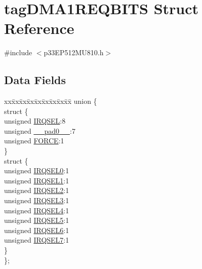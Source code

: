 \hypertarget{structtag_d_m_a1_r_e_q_b_i_t_s}{}\section{tag\+D\+M\+A1\+R\+E\+Q\+B\+I\+TS Struct Reference}
\label{structtag_d_m_a1_r_e_q_b_i_t_s}


{\ttfamily \#include $<$p33\+E\+P512\+M\+U810.\+h$>$}

\subsection*{Data Fields}
\begin{DoxyCompactItemize}
\item 
\begin{tabbing}
xx\=xx\=xx\=xx\=xx\=xx\=xx\=xx\=xx\=\kill
union \{\\
\>struct \{\\
\>\>unsigned \hyperlink{structtag_d_m_a1_r_e_q_b_i_t_s_a5e70ba01366ab2f37371d52661dd93b2}{IRQSEL}:8\\
\>\>unsigned \hyperlink{structtag_d_m_a1_r_e_q_b_i_t_s_adf71f3d8410c1f1dbbc96680a92c49af}{\_\_pad0\_\_}:7\\
\>\>unsigned \hyperlink{structtag_d_m_a1_r_e_q_b_i_t_s_a9b378a7ffc1ab4bc4a3710fb36389180}{FORCE}:1\\
\>\} \\
\>struct \{\\
\>\>unsigned \hyperlink{structtag_d_m_a1_r_e_q_b_i_t_s_ac73241b8f783760c9192dfd8a0773cad}{IRQSEL0}:1\\
\>\>unsigned \hyperlink{structtag_d_m_a1_r_e_q_b_i_t_s_a45e1f083e5a8a59f25acc35910732426}{IRQSEL1}:1\\
\>\>unsigned \hyperlink{structtag_d_m_a1_r_e_q_b_i_t_s_a60dda7474727b3624ca25fa0067a8924}{IRQSEL2}:1\\
\>\>unsigned \hyperlink{structtag_d_m_a1_r_e_q_b_i_t_s_aeaafe1b8c89398ed382054ab628aed78}{IRQSEL3}:1\\
\>\>unsigned \hyperlink{structtag_d_m_a1_r_e_q_b_i_t_s_a91c4162e0f3d4ac7adcdb49302f19840}{IRQSEL4}:1\\
\>\>unsigned \hyperlink{structtag_d_m_a1_r_e_q_b_i_t_s_a6382d50430464cf20b3dee3dbf2e8c01}{IRQSEL5}:1\\
\>\>unsigned \hyperlink{structtag_d_m_a1_r_e_q_b_i_t_s_ace52408ef8c29561f3c56a3fbcbc8217}{IRQSEL6}:1\\
\>\>unsigned \hyperlink{structtag_d_m_a1_r_e_q_b_i_t_s_acce7dedecdf1f53cdbead3edf7c5d53a}{IRQSEL7}:1\\
\>\} \\
\}; \\

\end{tabbing}\end{DoxyCompactItemize}


